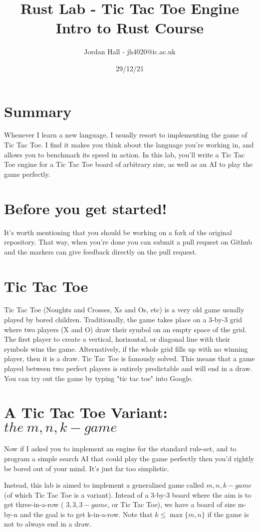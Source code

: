 \documentclass{report}
\title{%
    Rust Lab - Tic Tac Toe Engine \\
    \large Intro to Rust Course
    }
\author{Jordan Hall - jh4020@ic.ac.uk}
\date{29/12/21}
\begin{document}
\maketitle

\section*{Summary}
Whenever I learn a new language, I usually resort to implementing the game of Tic
Tac Toe. I find it makes you think about the language you're working in, and allows
you to benchmark its speed in action. In this lab, you'll write a Tic Tac Toe engine 
for a Tic Tac Toe board of arbitrary size, as well as an AI to play the game 
perfectly.

\section*{Before you get started!}
It's worth mentioning that you should be working on a fork of the original repository.
That way, when you're done you can submit a pull request on Github and the markers can
give feedback directly on the pull request.

\section*{Tic Tac Toe}
Tic Tac Toe (Noughts and Crosses, Xs and Os, etc) is a very old game usually played by 
bored children. Traditionally, the game takes place on a 3-by-3 grid where two players 
(X and O) draw their symbol on an empty space of the grid. The first player to 
create a vertical, horizontal, or diagonal line with their symbols wins the game.
Alternatively, if the whole grid fills up with no winning player, then it is a draw.
Tic Tac Toe is famously solved. This means that a game played between two perfect
players is entirely predictable and will end in a draw.
You can try out the game by typing "tic tac toe" into Google.

\section*{A Tic Tac Toe Variant: $the\ m,n,k-game$}
Now if I asked you to implement an engine for the standard rule-set, and to program
a simple search AI that could play the game perfectly then you'd rightly be bored
out of your mind. It's just far too simplistic. 


Instead, this lab is aimed to implement a generalized game called 
\href{https://en.wikipedia.org/wiki/M,n,k-game}{$m,n,k-game$}
(of which Tic Tac Toe is a variant). Intead of a 3-by-3 board where the aim is to get
three-in-a-row ( $3,3,3-game$, or Tic Tac Toe), we have a board of size m-by-n
and the goal is to get k-in-a-row. Note that $k \le \max\{ m, n\} $ if the game
is not to always end in a draw.
\end{document}
